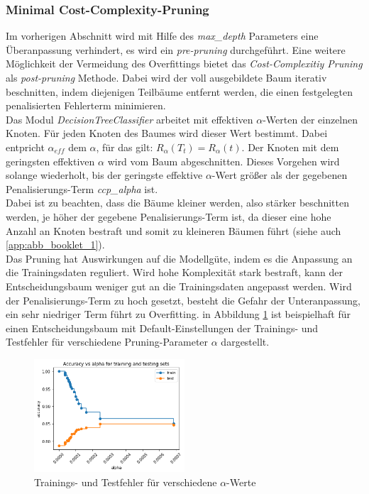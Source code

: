 \subsubsection{Minimal Cost-Complexity-Pruning}
Im vorherigen Abschnitt wird mit Hilfe des \emph{max\_depth} Parameters eine Überanpassung verhindert, es wird ein \emph{pre-pruning} durchgeführt. Eine weitere Möglichkeit der Vermeidung des Overfittings bietet das \emph{Cost-Complexitiy Pruning} als \emph{post-pruning} Methode. Dabei wird der voll ausgebildete Baum iterativ beschnitten, indem diejenigen Teilbäume entfernt werden, die einen festgelegten penalisierten Fehlerterm minimieren.\\
\noindent \hspace*{7mm}
Das Modul \emph{DecisionTreeClassifier} arbeitet mit effektiven $\alpha$-Werten der einzelnen Knoten. Für jeden Knoten des Baumes wird dieser Wert bestimmt. Dabei entpricht $\alpha_{eff}$ dem $\alpha$, für das gilt: $R_{\alpha}(T_{t})=R_{\alpha}(t)$. Der Knoten mit dem geringsten effektiven $\alpha$ wird vom Baum abgeschnitten. Dieses Vorgehen wird solange wiederholt, bis der geringste effektive $\alpha$-Wert größer als der gegebenen Penalisierungs-Term \emph{ccp\_alpha} ist.\\
\noindent \hspace*{7mm}
Dabei ist zu beachten, dass die Bäume kleiner werden, also stärker beschnitten werden, je höher der gegebene Penalisierungs-Term ist, da dieser eine hohe Anzahl an Knoten bestraft und somit zu kleineren Bäumen führt (siehe auch \ref{app:abb_booklet_1}).\\
\noindent \hspace*{7mm}
Das Pruning hat Auswirkungen auf die Modellgüte, indem es die Anpassung an die Trainingsdaten reguliert. Wird hohe Komplexität stark bestraft, kann der Entscheidungsbaum weniger gut an die Trainingsdaten angepasst werden. Wird der Penalisierungs-Term zu hoch gesetzt, besteht die Gefahr der Unteranpassung, ein sehr niedriger Term führt zu Overfitting. in Abbildung \ref{fig:ccp_accuracyVsAlpha} ist beispielhaft für einen Entscheidungsbaum mit Default-Einstellungen der Trainings- und Testfehler für verschiedene Pruning-Parameter $\alpha$ dargestellt.\\
\begin{figure}[h]
	\centering
	\includegraphics[width = 0.5\textwidth]{Bilder/ccp_accuracyVsAlpha.png}
	\caption{Trainings- und Testfehler für verschiedene $\alpha$-Werte}
	\label{fig:ccp_accuracyVsAlpha}
\end{figure}



